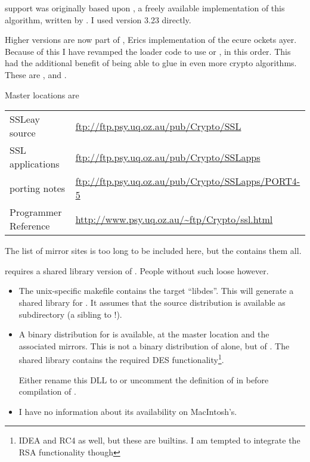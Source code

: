 \documentclass {report}
\begin{document}
 support was originally based upon , a freely available
implementation of this algorithm, written by \eay{}. I used version
3.23 directly.

Higher versions are now part of \SSLeay, Erics implementation of
the ecure ockets ayer. Because of this I
have revamped the  loader code to use  or
, in this order. This had the additional benefit of
being able to glue in even more crypto algorithms. These are
,  and .


Master locations are\vspace {1em}

{\small \begin {tabular} {|l|l|}\hline
 SSLeay source       	& \url {ftp://ftp.psy.uq.oz.au/pub/Crypto/SSL}       		\\
 SSL applications	& \url {ftp://ftp.psy.uq.oz.au/pub/Crypto/SSLapps}   		\\
 porting notes		& \url {ftp://ftp.psy.uq.oz.au/pub/Crypto/SSLapps/PORT4-5}	\\
 Programmer Reference	& \url {http://www.psy.uq.oz.au/~ftp/Crypto/ssl.html}		\\ \hline
\end {tabular}}\vspace {1em}

The list of mirror sites is too long to be included here, but the
\ssleayfaq{} contains them all.


\trf{} requires a shared library version of . People
without such  loose however.

\begin {itemize}
\item	The unix-specific makefile contains the target ``libdes''. This
	will generate a shared library for . It assumes that the
	 source distribution is available as subdirectory
	 (a sibling to  !).

\item	A binary distribution for \win{} is available, at the master
	location and the associated mirrors. This is not a binary
	distribution of  alone, but of . The
	shared library  contains the required DES
	functionality\footnote {IDEA and RC4 as well, but these are
	\trf {} builtins. I am tempted to integrate the RSA
	functionality though}.

	Either rename this DLL to  or uncomment the
	definition of  in  before
	compilation of \trf {}.

\item	I have no information about its availability on MacIntosh's.
\end   {itemize}
\end{document}
